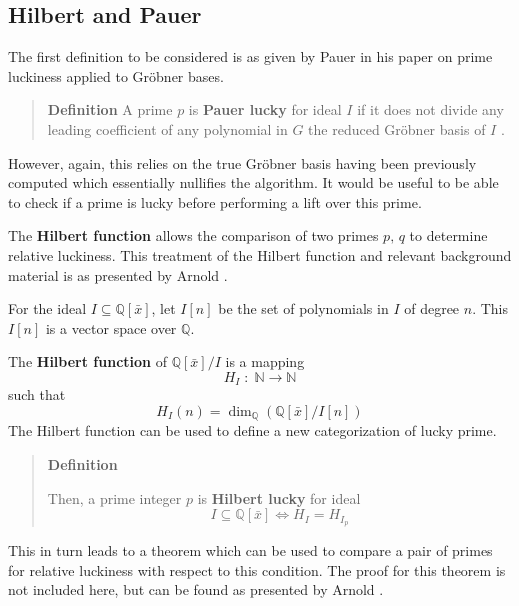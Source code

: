 \documentclass[letterpaper,12pt,titlepage,oneside,final]{book}
\newenvironment{defn}{\begin{quote}%
  \textbf{Definition }%
  \quad
}{%
\end{quote}%
}
\begin{document}
\subsection{Hilbert and Pauer}

The first definition to be considered is as given by Pauer in his paper on prime luckiness applied to Gr\"obner bases.  

\begin{defn}\label{Pauer lucky}
  A prime ${p}$ is \textbf{Pauer lucky} for ideal ${I}$ if it does not divide any leading coefficient of any polynomial in ${G}$ the reduced Gr\"obner basis of ${I}$ \hfill \cite{Pauer}.
\end{defn}

However, again, this relies on the true Gr\"obner basis having been previously computed which essentially nullifies the algorithm.  It would be useful to be able to check if a prime is lucky before performing a lift over this prime.    

The \textbf{Hilbert function} allows the comparison of two primes ${p,\, q}$ to determine relative luckiness.  This treatment of the Hilbert function and relevant background material is as presented by Arnold \cite{Arnold}.  

For the ideal ${I \subseteq \mathbb{Q}[\bar x]}$, let ${I[n]}$ be the set of polynomials in ${I}$ of degree ${n}$.  This ${I[n]}$ is a vector space over ${\mathbb{Q}}$.  

The \textbf{Hilbert function} of ${\mathbb{Q}[\bar x]/I}$ is a mapping
\begin{equation*}
  H_I\; : \; \mathbb{N} \rightarrow \mathbb{N}
\end{equation*}
such that
\begin{equation*}
  H_I(n) = \dim_{\mathbb{Q}}(\mathbb{Q}[\bar x]/I[n])
\end{equation*}
The Hilbert function can be used to define a new categorization of lucky prime.
\begin{defn}
  Then, a prime integer ${p}$ is \textbf{Hilbert lucky} for ideal \begin{equation*}I \subseteq \mathbb{Q}[\bar x] \iff H_I = H_{I_p}\end{equation*}  
\end{defn}

This in turn leads to a theorem which can be used to compare a pair of primes for relative luckiness with respect to this condition.  The proof for this theorem is not included here, but can be found as presented by Arnold \cite{Arnold}.
\end{document}
